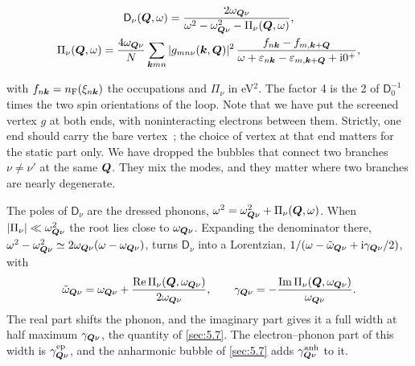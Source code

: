\begin{keyresult}
\begin{gather}
  \mathsf{D}_\nu(\bm{Q},\omega) = \frac{2\omega_{\bm{Q}\nu}}{\omega^2 - \omega_{\bm{Q}\nu}^2 - \Pi_\nu(\bm{Q},\omega)} , \notag\\
  \Pi_\nu(\bm{Q},\omega) = \frac{4\omega_{\bm{Q}\nu}}{N}\sum_{\bm{k}mn}|g_{mn\nu}(\bm{k},\bm{Q})|^2\,\frac{f_{n\bm{k}} - f_{m,\bm{k}+\bm{Q}}}{\omega + \varepsilon_{n\bm{k}} - \varepsilon_{m,\bm{k}+\bm{Q}} + \mathrm{i}0^+} ,
  \label{eq:6.4-Pi}
\end{gather}
\end{keyresult}
with $f_{n\bm{k}} = n_{\mathrm{F}}(\xi_{n\bm{k}})$ the occupations and $\Pi_\nu$ in eV$^2$. The factor 4 is the 2 of $\mathsf{D}_0^{-1}$ times the two spin orientations of the loop. Note that we have put the screened vertex $g$ at both ends, with noninteracting electrons between them. Strictly, one end should carry the bare vertex~\cite[Eqs.~(145) and~(146)]{giustino2017electron}; the choice of vertex at that end matters for the static part only. We have dropped the bubbles that connect two branches $\nu \ne \nu'$ at the same $\bm{Q}$. They mix the modes, and they matter where two branches are nearly degenerate.

The poles of $\mathsf{D}_\nu$ are the dressed phonons, $\omega^2 = \omega_{\bm{Q}\nu}^2 + \Pi_\nu(\bm{Q},\omega)$. When $|\Pi_\nu| \ll \omega_{\bm{Q}\nu}^2$ the root lies close to $\omega_{\bm{Q}\nu}$. Expanding the denominator there, $\omega^2 - \omega_{\bm{Q}\nu}^2 \simeq 2\omega_{\bm{Q}\nu}(\omega - \omega_{\bm{Q}\nu})$, turns $\mathsf{D}_\nu$ into a Lorentzian, $1/(\omega - \tilde\omega_{\bm{Q}\nu} + \mathrm{i}\gamma_{\bm{Q}\nu}/2)$, with
\begin{equation}
  \tilde\omega_{\bm{Q}\nu} = \omega_{\bm{Q}\nu} + \frac{\operatorname{Re}\Pi_\nu(\bm{Q},\omega_{\bm{Q}\nu})}{2\omega_{\bm{Q}\nu}} , \qquad
  \gamma_{\bm{Q}\nu} = -\frac{\operatorname{Im}\Pi_\nu(\bm{Q},\omega_{\bm{Q}\nu})}{\omega_{\bm{Q}\nu}} .
  \label{eq:6.4-pole}
\end{equation}
The real part shifts the phonon, and the imaginary part gives it a full width at half maximum $\gamma_{\bm{Q}\nu}$, the quantity of \cref{sec:5.7}. The electron--phonon part of this width is $\gamma^{\mathrm{ep}}_{\bm{Q}\nu}$, and the anharmonic bubble of \cref{sec:5.7} adds $\gamma^{\mathrm{anh}}_{\bm{Q}\nu}$ to it.

